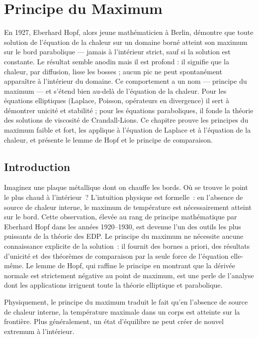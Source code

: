 \chapter{Principe du Maximum}
\label{ch:maximum}

En 1927, Eberhard Hopf, alors jeune mathématicien à Berlin, démontre que toute solution de l'équation de la chaleur sur un domaine borné atteint son maximum sur le bord parabolique --- jamais à l'intérieur strict, sauf si la solution est constante. Le résultat semble anodin mais il est profond : il signifie que la chaleur, par diffusion, lisse les bosses ; aucun pic ne peut spontanément apparaître à l'intérieur du domaine. Ce comportement a un nom --- principe du maximum --- et s'étend bien au-delà de l'équation de la chaleur. Pour les équations elliptiques (Laplace, Poisson, opérateurs en divergence) il sert à démontrer unicité et stabilité ; pour les équations paraboliques, il fonde la théorie des solutions de viscosité de Crandall-Lions. Ce chapitre prouve les principes du maximum faible et fort, les applique à l'équation de Laplace et à l'équation de la chaleur, et présente le lemme de Hopf et le principe de comparaison.

\section{Introduction}

Imaginez une plaque m\'etallique dont on chauffe les bords. O\`u se trouve le point le plus chaud \`a l'int\'erieur~? L'intuition physique est formelle~: en l'absence de source de chaleur interne, le maximum de temp\'erature est n\'ecessairement atteint sur le bord. Cette observation, \'elev\'ee au rang de principe math\'ematique par Eberhard Hopf dans les ann\'ees 1920--1930, est devenue l'un des outils les plus puissants de la th\'eorie des EDP. Le principe du maximum ne n\'ecessite aucune connaissance explicite de la solution~: il fournit des bornes a priori, des r\'esultats d'unicit\'e et des th\'eor\`emes de comparaison par la seule force de l'\'equation elle-m\^eme. Le lemme de Hopf, qui raffine le principe en montrant que la d\'eriv\'ee normale est strictement n\'egative au point de maximum, est une perle de l'analyse dont les applications irriguent toute la th\'eorie elliptique et parabolique.

\begin{intuition}
Physiquement, le principe du maximum traduit le fait qu'en l'absence de
source de chaleur interne, la temp\'erature maximale dans un corps est
atteinte sur la fronti\`ere. Plus g\'en\'eralement, un \'etat d'\'equilibre
ne peut cr\'eer de nouvel extremum \`a l'int\'erieur.
\end{intuition}

